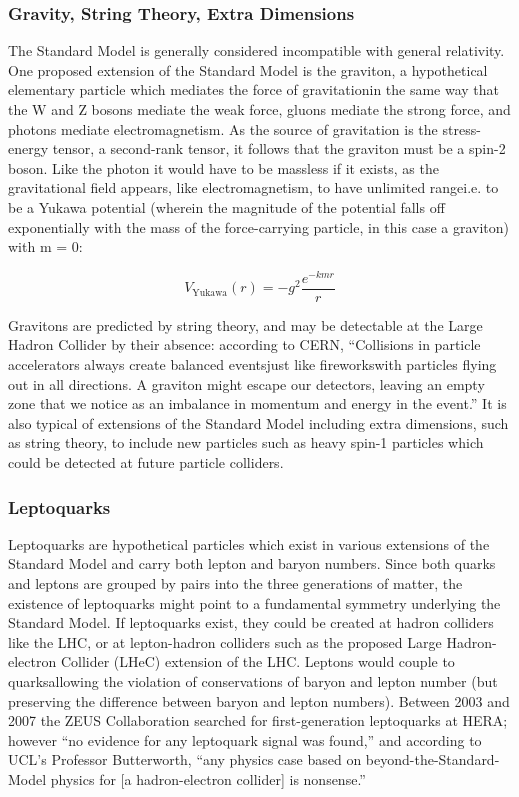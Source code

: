 \subsubsection{Gravity, String Theory, Extra Dimensions}
The Standard Model is generally considered incompatible with general relativity. One proposed extension of the Standard Model is the graviton, a hypothetical elementary particle which mediates the force of gravitation\textemdash in the same way that the W and Z bosons mediate the weak force, gluons mediate the strong force, and photons mediate electromagnetism. As the source of gravitation is the stress-energy tensor, a second-rank tensor, it follows that the graviton must be a spin-2 boson. Like the photon it would have to be massless if it exists, as the gravitational field appears, like electromagnetism, to have unlimited range\textemdash i.e. to be a Yukawa potential (wherein the magnitude of the potential falls off exponentially with the mass of the force-carrying particle, in this case a graviton) with m = 0:

\begin{equation*}
V_\text{Yukawa}(r)= -g^2\frac{e^{-kmr}}{r}
\end{equation*}

Gravitons are predicted by string theory, and may be detectable at the Large Hadron Collider by their absence: according to CERN, ``Collisions in particle accelerators always create balanced events\textemdash just like fireworks\textemdash with particles flying out in all directions. A graviton might escape our detectors, leaving an empty zone that we notice as an imbalance in momentum and energy in the event.''\cite{CERN:Gravitons:Online,deAquino:Gravitons} It is also typical of extensions of the Standard Model including extra dimensions, such as string theory, to include new particles such as heavy spin-1 particles which could be detected at future particle colliders\cite{CLIC:Concept}.

\subsubsection{Leptoquarks}
Leptoquarks are hypothetical particles which exist in various extensions of the Standard Model and carry both lepton and baryon numbers\cite{PDG:Leptoquark}. Since both quarks and leptons are grouped by pairs into the three generations of matter, the existence of leptoquarks might point to a fundamental symmetry underlying the Standard Model. If leptoquarks exist, they could be created at hadron colliders like the LHC, or at lepton-hadron colliders such as the proposed Large Hadron-electron Collider (LHeC) extension of the LHC\cite{Waters:Interview}. Leptons would couple to quarks\textemdash allowing the violation of conservations of baryon and lepton number (but preserving the difference between baryon and lepton numbers). Between 2003 and 2007 the ZEUS Collaboration searched for first-generation leptoquarks at HERA; however ``no evidence for any leptoquark signal was found,''\cite{ZEUS:Leptoquark} and according to UCL's Professor Butterworth, ``any physics case based on beyond-the-Standard-Model physics for [a hadron-electron collider] is nonsense.''\cite{Butterworth:Interview}
